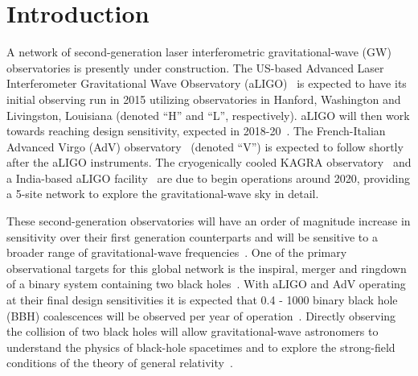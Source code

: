 \documentclass[12pt]{iopart}
\begin{document}
\section{Introduction}
\label{sec:introduction}
A network of second-generation laser interferometric
gravitational-wave (GW) observatories is presently under construction.
The US-based Advanced Laser Interferometer Gravitational Wave 
Observatory (aLIGO)~\cite{Harry:2010zz} is expected to have its
initial observing run in 2015 utilizing observatories in Hanford,
Washington and Livingston, Louisiana (denoted ``H'' and ``L'', respectively). 
aLIGO will then work towards reaching design
sensitivity, expected in 2018-20~\cite{Aasi:2013wya}. The
French-Italian Advanced Virgo (AdV) observatory~\cite{Accadia:2011zzc,aVIRGO}
(denoted ``V'') is expected to follow shortly after the
aLIGO instruments. The cryogenically cooled KAGRA
observatory~\cite{Kuroda:2010zzb,Somiya:2011np} and a India-based aLIGO
facility~\cite{LIGODCC:M1100296,Unnikrishnan:2013qwa} are due to begin 
operations around
2020, providing a 5-site network to explore the gravitational-wave sky
in detail.

These second-generation observatories will have an order of magnitude
increase in sensitivity over their first generation counterparts and
will be sensitive to a broader range of gravitational-wave
frequencies~\cite{Harry:2010zz,aVIRGO,Somiya:2011np}. One of the
primary observational targets for this global network is the inspiral, merger 
and ringdown of a binary system containing two black 
holes~\cite{thorne.k:1987}. 
With aLIGO and AdV operating at their final design sensitivities
it is expected that 0.4 - 1000 binary black hole (BBH) coalescences
will be observed per year of operation~\cite{Abadie:2010cf}.  Directly
observing the collision of two black holes will allow
gravitational-wave astronomers to understand the physics of black-hole
spacetimes and to explore the strong-field conditions of the
theory of general relativity~\cite{Sathyaprakash:2009xs}.
\end{document}
